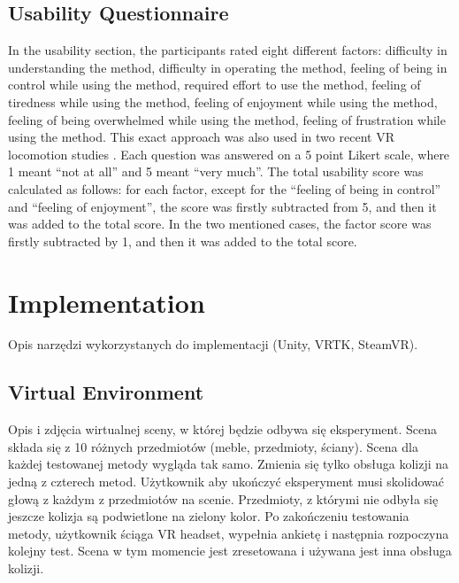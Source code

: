 \subsection{Usability Questionnaire}

In the usability section, the participants rated eight different factors: difficulty in understanding the method, difficulty in operating the method, feeling of being in control while using the method, required effort to use the method, feeling of tiredness while using the method, feeling of enjoyment while using the method, feeling of being overwhelmed while using the method, feeling of frustration while using the method. This exact approach was also used in two recent VR locomotion studies \cite{TELEPORTATIONSTUDY}\cite{NODEBASEDTELEPORTATION}. Each question was answered on a 5 point Likert scale, where 1 meant ``not at all'' and 5 meant ``very much''. The total usability score was calculated as follows: for each factor, except for the ``feeling of being in control'' and ``feeling of enjoyment'', the score was firstly subtracted from 5, and then it was added to the total score. In the two mentioned cases, the factor score was firstly subtracted by 1, and then it was added to the total score.

\section{Implementation}

Opis narzędzi wykorzystanych do implementacji (Unity, VRTK, SteamVR).

\subsection{Virtual Environment}

Opis i zdjęcia wirtualnej sceny, w której będzie odbywa się eksperyment. Scena składa się z 10 różnych przedmiotów (meble, przedmioty, ściany). Scena dla każdej testowanej metody wygląda tak samo. Zmienia się tylko obsługa kolizji na jedną z czterech metod. Użytkownik aby ukończyć eksperyment musi skolidować głową z każdym z przedmiotów na scenie. Przedmioty, z którymi nie odbyła się jeszcze kolizja są podwietlone na zielony kolor. Po zakończeniu testowania metody, użytkownik ściąga VR headset, wypełnia ankietę i następnia rozpoczyna kolejny test. Scena w tym momencie jest zresetowana i używana jest inna obsługa kolizji.

